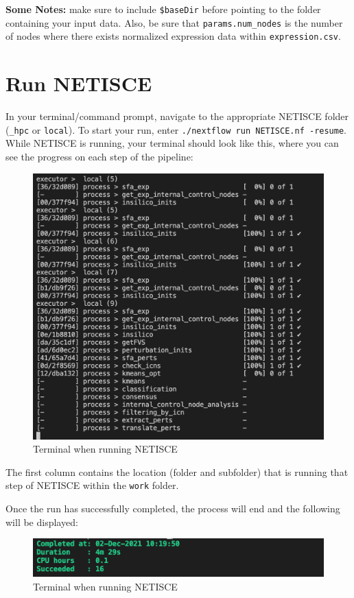 \documentclass[
]{book}
\begin{document}
\textbf{Some Notes: } make sure to include \texttt{\$baseDir} before pointing to the folder containing your input data. Also, be sure that \texttt{params.num\_nodes} is the number of nodes where there exists normalized expression data within \texttt{expression.csv}.

\hypertarget{run-netisce}{%
\section{Run NETISCE}\label{run-netisce}}

In your terminal/command prompt, navigate to the appropriate NETISCE folder (\texttt{\_hpc} or \texttt{local}). To start your run, enter \texttt{./nextflow\ run\ NETISCE.nf\ -resume}.
While NETISCE is running, your terminal should look like this, where you can see the progress on each step of the pipeline:

\begin{figure}

{\centering \includegraphics[width=0.5\linewidth]{images/running_shot} 

}

\caption{Terminal when running NETISCE}\label{fig:unnamed-chunk-7}
\end{figure}

The first column contains the location (folder and subfolder) that is running that step of NETISCE within the \texttt{work} folder.

Once the run has successfully completed, the process will end and the following will be displayed:

\begin{figure}

{\centering \includegraphics[width=0.5\linewidth]{images/completed} 

}

\caption{Terminal when running NETISCE}\label{fig:unnamed-chunk-8}
\end{figure}
\end{document}
